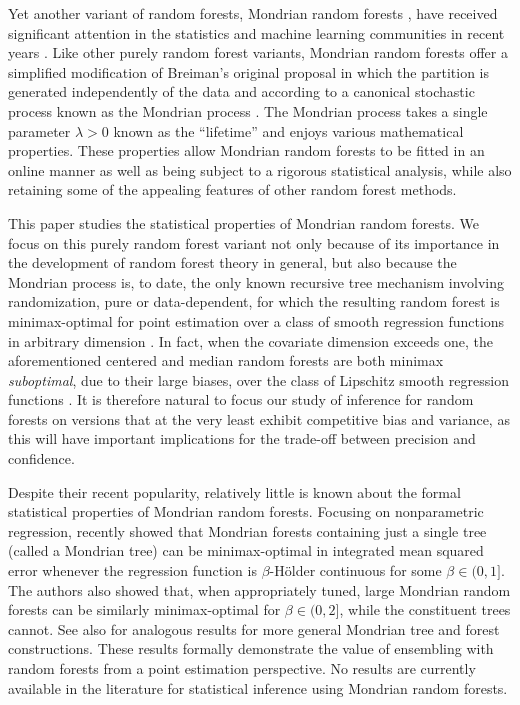 Yet another variant of random forests, Mondrian random forests
\citep{lakshminarayanan2014mondrian},
have received significant attention in the statistics
and machine learning communities
in recent years
\citep{ma2020isolation, mourtada2020minimax, scillitoe2021uncertainty,
  mourtada2021amf, vicuna2021reducing, gao2022towards,
o2022stochastic}.
Like other purely random forest variants,
Mondrian random forests offer a simplified modification of
Breiman's original proposal
in which the partition is generated independently of the data
and according to a canonical stochastic process known as
the Mondrian process \citep{roy2008mondrian}.
The Mondrian process takes a single parameter $\lambda > 0$
known as the ``lifetime''
and enjoys various mathematical properties.
These properties allow Mondrian random forests to be
fitted in an online manner as well as being
subject to a rigorous statistical analysis,
while also retaining some of the appealing features
of other random forest methods.

This paper studies the statistical properties of Mondrian random forests.
We focus on this purely random forest variant not only because of its
importance in the development of random forest theory in general,
but also because the Mondrian process is, to date,
the only known recursive tree mechanism involving randomization,
pure or data-dependent, for which the resulting random forest is
minimax-optimal for point estimation over a class of smooth regression
functions in arbitrary dimension \citep{mourtada2020minimax}.
In fact, when the covariate dimension exceeds one,
the aforementioned centered and median random forests are both minimax
\emph{suboptimal}, due to their large biases, over the class of Lipschitz
smooth regression functions \citep{klusowski2021sharp}.
It is therefore natural to
focus our study of inference for random forests on versions that at the very
least exhibit competitive bias and variance, as this will have important
implications for the trade-off between precision and confidence.

Despite their recent popularity, relatively little is
known about the formal
statistical properties of Mondrian random forests.
Focusing on nonparametric regression, \citet{mourtada2020minimax}
recently showed that Mondrian forests containing just a single tree
(called a Mondrian tree) can be minimax-optimal in integrated mean squared
error
whenever the regression function is
$\beta$-H{\"o}lder continuous for some $\beta \in (0, 1]$.
The authors also showed that, when appropriately tuned,
large Mondrian random forests can be similarly
minimax-optimal for $\beta \in (0, 2]$, while the constituent trees cannot.
See also \citet{o2022stochastic} for analogous results for more general
Mondrian tree and forest constructions.
These results formally demonstrate the value of ensembling with random forests
from a point estimation perspective.
No results are currently available in the literature for
statistical inference using Mondrian random forests.

